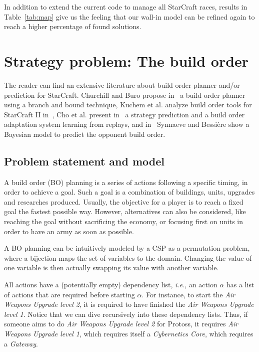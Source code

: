 \documentclass[journal]{IEEEtran}
\newcommand{\csp}{\textsc{CSP}\xspace}
\newcommand{\ie}{\textit{i.e.}}
\begin{document}
In addition to extend the current  code to manage all StarCraft races,
results in  Table~\ref{tab:map} give us  the feeling that  our wall-in
model  can be  refined again  to reach  a higher  percentage of  found
solutions.


\section{Strategy problem: The build order}\label{sec:bo}

The reader can find an  extensive literature about build order planner
and/or   prediction  for   StarCraft.  Churchill   and  Buro   propose
in~\cite{ChurchillB11} a build order planner  using a branch and bound
technique, Kuchem  et al. analyze  build order tools for  StarCraft II
in~\cite{KuchemPR13},  Cho  et  al.    present  in~\cite{ChoKC13}  a
strategy prediction  and a build  order adaptation system  learning from
replays, and  in~\cite{SynnaeveB11-a} Synnaeve and Bessi{\`e}re  show a
Bayesian model to predict the opponent build order.

\subsection{Problem statement and model}
A build order (BO) planning is a series of actions following a specific
timing, in order to  achieve a goal.  Such a goal  is a combination of
buildings,  units, upgrades  and  researches  produced.  Usually,  the
objective for a  player is to reach a fixed  goal the fastest possible
way. However, alternatives  can also be considered,  like reaching the
goal without sacrificing  the economy, or focusing first  on units in
order to have an army as soon as possible.

A  BO  planning can  be intuitively  modeled by  a \csp  as a
permutation problem,  where a bijection  maps the set of  variables to
the  domain. Changing  the  value  of one  variable  is then  actually
swapping its value with another variable.

All actions have a (potentially empty) dependency list, \ie, an action
$\alpha$  has a  list of  actions  that are  required before  starting
$\alpha$.   For instance,  to  start the  \textit{Air Weapons  Upgrade
  level 2},  it is required  to have finished the  \textit{Air Weapons
  Upgrade level  1}. Notice  that we can  dive recursively  into these
dependency  lists.  Thus,  if someone  aims to  do \textit{Air  Weapons
  Upgrade  level  2}  for  Protoss, it  requires  \textit{Air  Weapons
  Upgrade level 1}, which requires itself a \textit{Cybernetics Core},
which requires a \textit{Gateway}.
\end{document}
